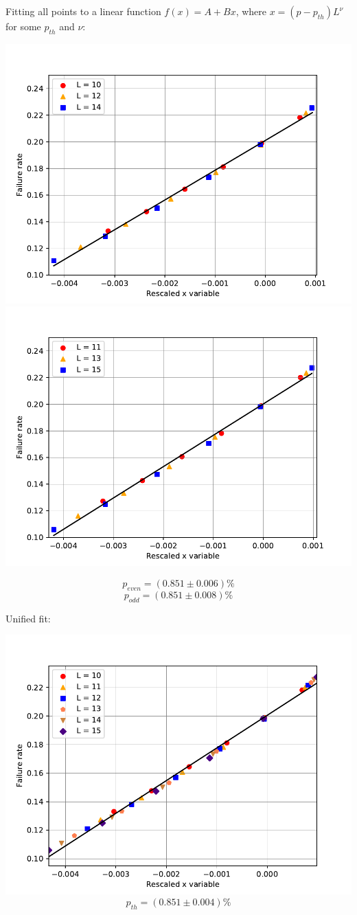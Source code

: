 \documentclass[pra]{revtex4-1}
\begin{document}
\noindent Fitting all points to a linear function $f(x) = A + Bx$, where $x=(p-p_{th})L^{\nu}$ for some $p_{th}$ and $\nu$: 
  
\includegraphics[width=.49\textwidth]{../graphs-paper2/fsf-dephasing-even-rescaled.pdf}
\includegraphics[width=.49\textwidth]{../graphs-paper2/fsf-dephasing-odd-rescaled.pdf}

\[  p_{even} = (0.851 \pm 0.006)\% \]
\[  p_{odd} = (0.851 \pm 0.008)\% \]
\clearpage 

Unified fit: \begin{center} 

\includegraphics[width=.9\textwidth]{../graphs-paper2/fsf-dephasing-rescaled.pdf}
\[  p_{th} = (0.851 \pm 0.004)\% \] \end{center}
\clearpage 
\end{document}
